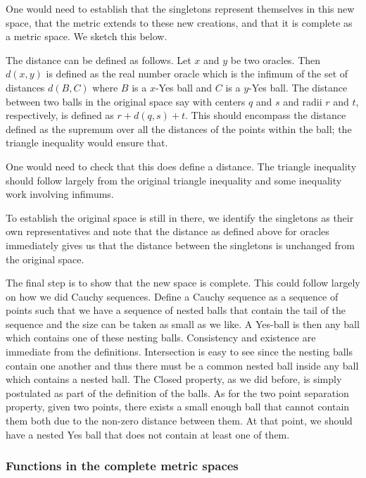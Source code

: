 \documentclass[12pt]{article}
\theoremstyle{remark}
\begin{document}
One would need to establish that the singletons represent themselves in this new space, that the metric extends to these new creations, and that it is complete as a metric space. We sketch this below.

The distance can be defined as follows. Let $x$ and $y$ be two oracles. Then $d(x,y)$ is defined as the real number oracle which is the infimum of the set of distances $d(B, C)$ where $B$ is a $x$-Yes ball and $C$ is a $y$-Yes ball. The distance between two balls in the original space say with centers $q$ and $s$ and radii $r$ and $t$, respectively, is defined as $r + d(q,s) + t$. This should encompass the distance defined as the supremum over all the distances of the points within the ball; the triangle inequality would ensure that.  

One would need to check that this does define a distance. The triangle inequality should follow largely from the original triangle inequality and some inequality work involving infimums. 

To establish the original space is still in there, we identify the singletons as their own representatives and note that the distance as defined above for oracles immediately gives us that the distance between the singletons is unchanged from the original space. 

The final step is to show that the new space is complete. This could follow largely on how we did Cauchy sequences. Define a Cauchy sequence as a sequence of points such that we have a sequence of nested balls that contain the tail of the sequence and the size can be taken as small as we like. A Yes-ball is then any ball which contains one of these nesting balls. Consistency and existence are immediate from the definitions. Intersection is easy to see since the nesting balls contain one another and thus there must be a common nested ball inside any ball which contains a nested ball. The Closed property, as we did before, is simply postulated as part of the definition of the balls. As for the two point separation property, given two points, there exists a small enough ball that cannot contain them both due to the non-zero distance between them. At that point, we should have a nested Yes ball that does not contain at least one of them. 

\subsubsection{Functions in the complete metric spaces}
\end{document}
